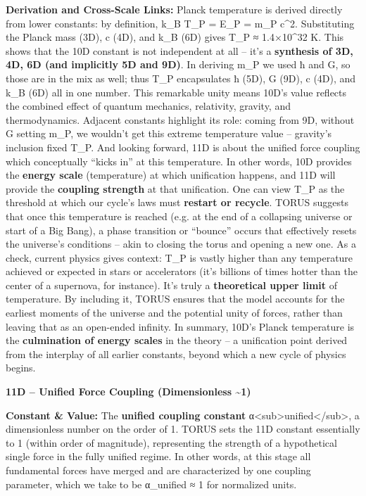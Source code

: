 \textbf{Derivation and Cross-Scale Links:} Planck temperature is derived
directly from lower constants: by definition, k\_B T\_P = E\_P = m\_P
c\^{}2​. Substituting the Planck mass (3D), c (4D), and k\_B (6D) gives
T\_P ≈ 1.4×10\^{}32 K​. This shows that the 10D constant is not
independent at all -- it's a \textbf{synthesis of 3D, 4D, 6D (and
implicitly 5D and 9D)}​. In deriving m\_P we used ħ and G, so those are
in the mix as well; thus T\_P encapsulates ħ (5D), G (9D), c (4D), and
k\_B (6D) all in one number​. This remarkable unity means 10D's value
reflects the combined effect of quantum mechanics, relativity, gravity,
and thermodynamics. Adjacent constants highlight its role: coming from
9D, without G setting m\_P, we wouldn't get this extreme temperature
value -- gravity's inclusion fixed T\_P. And looking forward, 11D is
about the unified force coupling which conceptually ``kicks in'' at this
temperature. In other words, 10D provides the \textbf{energy scale}
(temperature) at which unification happens, and 11D will provide the
\textbf{coupling strength} at that unification​. One can view T\_P as
the threshold at which our cycle's laws must \textbf{restart or
recycle}. TORUS suggests that once this temperature is reached (e.g. at
the end of a collapsing universe or start of a Big Bang), a phase
transition or ``bounce'' occurs that effectively resets the universe's
conditions -- akin to closing the torus and opening a new one​. As a
check, current physics gives context: T\_P is vastly higher than any
temperature achieved or expected in stars or accelerators (it's billions
of times hotter than the center of a supernova, for instance). It's
truly a \textbf{theoretical upper limit} of temperature. By including
it, TORUS ensures that the model accounts for the earliest moments of
the universe and the potential unity of forces, rather than leaving that
as an open-ended infinity. In summary, 10D's Planck temperature is the
\textbf{culmination of energy scales} in the theory -- a unification
point derived from the interplay of all earlier constants, beyond which
a new cycle of physics begins.

\textbf{11D -- Unified Force Coupling (Dimensionless
\textasciitilde{}1)}

\textbf{Constant \& Value:} The \textbf{unified coupling constant}
α\textless{}sub\textgreater{}unified\textless{}/sub\textgreater{}, a
dimensionless number on the order of 1​. TORUS sets the 11D constant
essentially to 1 (within order of magnitude), representing the strength
of a hypothetical single force in the fully unified regime. In other
words, at this stage all fundamental forces have merged and are
characterized by one coupling parameter, which we take to be α\_unified
≈ 1 for normalized units.

